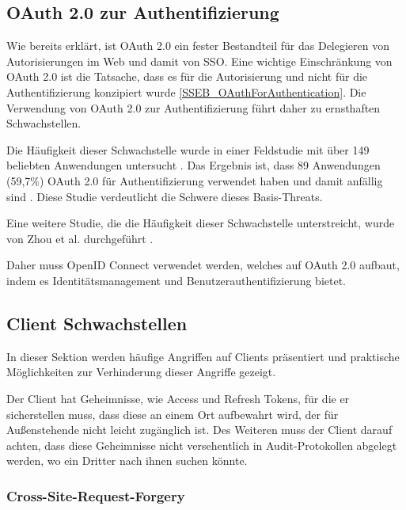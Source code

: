 \subsection{OAuth 2.0 zur Authentifizierung}

Wie bereits erklärt, ist OAuth 2.0 ein fester Bestandteil für das Delegieren von Autorisierungen im Web und damit von SSO. Eine wichtige Einschränkung von OAuth 2.0 ist die Tatsache, dass es für die Autorisierung und nicht für die Authentifizierung konzipiert wurde \ref{SSEB_OAuthForAuthentication}. Die Verwendung von OAuth 2.0 zur Authentifizierung führt daher zu ernsthaften Schwachstellen.

Die Häufigkeit dieser Schwachstelle wurde in einer Feldstudie mit über 149 beliebten Anwendungen untersucht \cite{SSEB_chen2014oauth}. Das Ergebnis ist, dass 89 Anwendungen (59,7\%) OAuth 2.0 für Authentifizierung verwendet haben und damit anfällig sind \cite{SSEB_chen2014oauth}. Diese Studie verdeutlicht die Schwere dieses Basis-Threats.

Eine weitere Studie, die die Häufigkeit dieser Schwachstelle unterstreicht, wurde von Zhou et al. durchgeführt \cite{SSEB_184435}.


Daher muss OpenID Connect verwendet werden, welches auf OAuth 2.0 aufbaut, indem es Identitätsmanagement und Benutzerauthentifizierung bietet.

\subsection{Client Schwachstellen}

In dieser Sektion werden häufige Angriffen auf Clients präsentiert und praktische Möglichkeiten zur Verhinderung dieser Angriffe gezeigt.

Der Client hat Geheimnisse, wie Access und Refresh Tokens, für die er sicherstellen muss, dass diese an einem Ort aufbewahrt wird, der für Außenstehende nicht leicht zugänglich ist. Des Weiteren muss der Client darauf achten, dass diese Geheimnisse nicht versehentlich in Audit-Protokollen abgelegt werden, wo ein Dritter nach ihnen suchen könnte.

\subsubsection{Cross-Site-Request-Forgery} \label{SSEB_Cross-Site-Request-Forgery}


